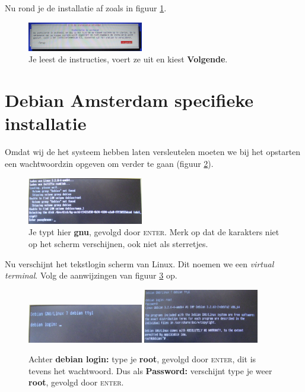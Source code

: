 \documentclass[12pt,a4paper]{article}
\begin{document}
Nu rond je de installatie af zoals in figuur \ref{fig:afronden}.

\begin{figure}[H]
\centering
\includegraphics[width=0.45\textwidth]{installatie-afronden-scherm}
\caption{Je leest de instructies, voert ze uit en kiest \textbf{Volgende}.}
\label{fig:afronden}
\end{figure}

\section{Debian Amsterdam specifieke installatie}

Omdat wij de het systeem hebben laten versleutelen moeten we bij het opstarten een wachtwoordzin opgeven om verder te gaan (figuur \ref{fig:diskwachtwoord}).

\begin{figure}[H]
\centering
\includegraphics[width=0.45\textwidth]{diskwachtwoordzin-scherm}
\caption{Je typt hier \textbf{gnu}, gevolgd door \textsc{enter}. Merk op dat de karakters niet op het scherm verschijnen, ook niet als sterretjes.}
\label{fig:diskwachtwoord}
\end{figure}

Nu verschijnt het tekstlogin scherm van Linux. Dit noemen we een \textit{virtual terminal}. Volg de aanwijzingen van figuur \ref{fig:loginprompt} op.

\begin{figure}[H]
\centering
\includegraphics[width=0.45\textwidth]{loginprompt-scherm}
\includegraphics[width=0.45\textwidth]{ingelogd-scherm}
\caption{Achter \textbf{debian login:} type je \textbf{root}, gevolgd door \textsc{enter}, dit is tevens het wachtwoord. Dus als \textbf{Password:} verschijnt type je weer \textbf{root}, gevolgd door \textsc{enter}.}
\label{fig:loginprompt}
\end{figure}
\end{document}
